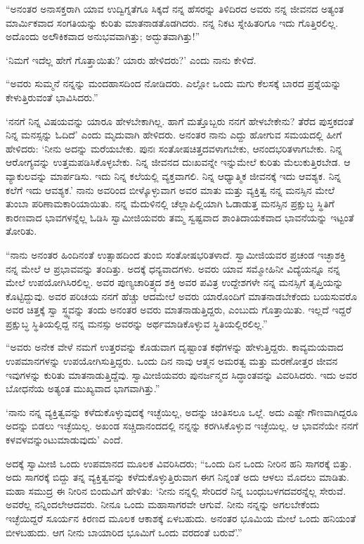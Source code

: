  “ಅನಂತರ ಅನಾಸಕ್ತರಾಗಿ ಯಾವ ಉದ್ವಿಗ್ನತೆಗೂ ಸಿಕ್ಕದೆ ನನ್ನ ಹೆಸರನ್ನು ತಿಳಿದಿರದ ಅವರು ನನ್ನ ಜೀವನದ ಅತ್ಯಂತ ಮಾರ್ಮಿಕವಾದ ಸಂಗತಿಯನ್ನು ಕುರಿತು ಮಾತನಾಡತೊಡಗಿದರು. ನನ್ನ ನಿಕಟ ಸ್ನೇಹಿತರಿಗೂ ಇದು ಗೊತ್ತಿರಲಿಲ್ಲ. ಅದೊಂದು ಅಲೌಕಿಕವಾದ ಅನುಭವವಾಗಿತ್ತು; ಅದ್ಭುತವಾಗಿತ್ತು!” 

 ‘ನಿಮಗೆ ಇದೆಲ್ಲ ಹೇಗೆ ಗೊತ್ತಾಯಿತು? ಯಾರು ಹೇಳಿದರು?’ ಎಂದು ನಾನು ಕೇಳಿದೆ. 

 “ಅವರು ಸುಮ್ಮನೆ ನನ್ನನ್ನು ಮಂದಹಾಸದಿಂದ ನೋಡಿದರು. ಎಲ್ಲೋ ಒಂದು ಮಗು ಕೆಲಸಕ್ಕೆ ಬಾರದ ಪ್ರಶ್ನೆಯನ್ನು ಕೇಳುತ್ತಿರುವಂತೆ ಭಾವಿಸಿದರು.” 

 ‘ನನಗೆ ನಿನ್ನ ವಿಷಯವನ್ನು ಯಾರೂ ಹೇಳಬೇಕಾಗಿಲ್ಲ. ಹಾಗೆ ಮತ್ತೊಬ್ಬರು ನನಗೆ ಹೇಳಬೇಕೇನು? ತೆರೆದ ಪುಸ್ತಕದಂತೆ ನಿನ್ನ ಮನಸ್ಸನ್ನು ಓದಿದೆ’ ಎಂದು ಮೃದುವಾಗಿ ಹೇಳಿದರು. ಅನಂತರ ನಾನು ಎದ್ದು ಹೋಗುವ ಸಮಯದಲ್ಲಿ ಹೀಗೆ ಹೇಳಿದರು: ‘ನೀನು ಅದನ್ನು ಮರೆಯಬೇಕು. ಪುನಃ ಸಂತೋಷಚಿತ್ತದವಳಾಗಬೇಕು, ಆನಂದಭರಿತಳಾಗಬೇಕು. ನಿನ್ನ ಆರೋಗ್ಯವನ್ನು ಉತ್ತಮಪಡಿಸಿಕೊಳ್ಳಬೇಕು. ನಿನ್ನ ಜೀವನದ ದುಃಖವನ್ನೇ ಇನ್ನುಮೇಲೆ ಕುರಿತು ಮೆಲುಕುತ್ತಿರಬೇಡ. ಆ ವ್ಯಾಕುಲವನ್ನು ಮಾರ್ಪಡಿಸು. ಇದು ನಿನ್ನ ಕಲೆಯಲ್ಲಿ ವ್ಯಕ್ತವಾಗಲಿ. ನಿನ್ನ ಆಧ್ಯಾತ್ಮಿಕ ಜೀವನಕ್ಕೆ ಇದು ಆವಶ್ಯಕ. ನಿನ್ನ ಕಲೆಗೆ ಇದು ಆವಶ್ಯಕ.’ ನಾನು ಅವರಿಂದ ಬೀಳ್ಕೊಳ್ಳುವಾಗ ಅವರ ಮಾತು ಮತ್ತು ವ್ಯಕ್ತಿತ್ವ ನನ್ನ ಮನಸ್ಸಿನ ಮೇಲೆ ತುಂಬಾ ಪರಿಣಾಮಕಾರಿಯಾಯಿತು. ನನ್ನ ಮೆದುಳಿನಲ್ಲಿ ಚೆಲ್ಲಾಪಿಲ್ಲಿಯಾಗಿ ಓಡಾಡುತ್ತ ಮನಸ್ಸಿನ ಪ್ರಕ್ಷುಬ್ಧ ಸ್ಥಿತಿಗೆ ಕಾರಣವಾದ ಭಾವಗಳನ್ನೆಲ್ಲ ಓಡಿಸಿ ಸ್ವಾಮೀಜಿಯವರು ತಮ್ಮ ಸ್ವಷ್ಟವಾದ ಶಾಂತಿದಾಯಕವಾದ ಭಾವನೆಯನ್ನು ಇಟ್ಟಂತೆ ತೋರಿತು. 

 “ನಾನು ಅನಂತರ ಹಿಂದಿನಂತೆ ಉತ್ಸಾಹದಿಂದ ತುಂಬಿ ಸಂತೋಷಭರಿತಳಾದೆ. ಸ್ವಾಮೀಜಿಯವರ ಪ್ರಚಂಡ ಇಚ್ಛಾಶಕ್ತಿ ನನ್ನ ಮೇಲೆ ಆ ಪ್ರಭಾವವನ್ನು ತಂದಿತ್ತು. ಅದಕ್ಕೆ ಧನ್ಯವಾದಗಳು. ಅವರು ಯಾವ ಸಮ್ಮೋಹಿನೀ ವಿದ್ಯೆಯನ್ನೂ ನನ್ನ ಮೇಲೆ ಉಪಯೋಗಿಸಿರಲಿಲ್ಲ. ಅವರ ಪುಣ್ಯಚಾರಿತ್ರ್ಯದ ಶಕ್ತಿ ಅವರ ಪವಿತ್ರ ಉದ್ದೇಶಗಳೇ ನನ್ನ ಮನಸ್ಸಿಗೆ ತೃಪ್ತಿಯನ್ನು ಕೊಟ್ಟಿದ್ದುವು. ಅವರ ಪರಿಚಯ ನನಗೆ ಹೆಚ್ಚು ಆದಮೇಲೆ ಅವರು ಯಾರೊಂದಿಗೆ ಮಾತನಾಡಬೇಕೆಂದು ಬಯಸುವರೊ ಅವರ ಚಿತ್ತಕ್ಕೆ ಸ್ವಾ ಸ್ಥ್ಯವನ್ನು ತಂದು ಅನಂತರ ಅವರು ಮಾತನಾಡುತ್ತಿದ್ದರು, ಎಂಬುದು ಗೊತ್ತಾಯಿತು. ಇಲ್ಲದೆ ಇದ್ದರೆ ಪ್ರಕ್ಷುಬ್ಧ ಸ್ಥಿತಿಯಲ್ಲಿದ್ದ ನನ್ನ ಮನಸ್ಸು ಅವರನ್ನು ಅರ್ಥಮಾಡಿಕೊಳ್ಳುವ ಸ್ಥಿತಿಯಲ್ಲಿರಲಿಲ್ಲ.” 

 “ಅವರು ಅನೇಕ ವೇಳೆ ನಮಗೆ ಉತ್ತರವನ್ನು ಕೊಡುವಾಗ ದೃಷ್ಟಾಂತ ಕಥೆಗಳನ್ನು ಹೇಳುತ್ತಿದ್ದರು. ಕಾವ್ಯಮಯವಾದ ಉಪಮಾನಗಳನ್ನು ಉಪಯೋಗಿಸುತ್ತಿದ್ದರು. ಒಂದು ದಿನ ನಾವು ಆತ್ಮನ ಅಮರತ್ವ ಮತ್ತು ಮರಣೋತ್ತರ ಜೀವನ ಇವುಗಳನ್ನು ಕುರಿತು ಮಾತನಾಡುತ್ತಿದ್ದೆವು. ಸ್ವಾಮೀಜಿಯವರು ಪುನರ್ಜನ್ಮದ ಸಿದ್ಧಾಂತವನ್ನು ವಿವರಿಸಿದರು. ಇದು ಅವರ ಬೋಧನೆಯ ಅತ್ಯಂತ ಮುಖ್ಯವಾದ ಭಾಗವಾಗಿತ್ತು.” 

 ‘ನಾನು ನನ್ನ ವ್ಯಕ್ತಿತ್ವವನ್ನು ಕಳೆದುಕೊಳ್ಳುವುದಕ್ಕೆ ಇಚ್ಛೆಯಿಲ್ಲ, ಅದನ್ನು ಚಿಂತಿಸಲೂ ಒಲ್ಲೆ. ಅದು ಎಷ್ಟೇ ಗೌಣವಾಗಿದ್ದರೂ ಅದನ್ನು ಬಿಡಲು ಇಚ್ಛೆಯಿಲ್ಲ. ಅಖಂಡ ಸಚ್ಚಿದಾನಂದದಲ್ಲಿ ನನ್ನನ್ನು ಕರಗಿಸಿಕೊಳ್ಳುವ ಇಚ್ಛೆಯಿಲ್ಲ. ಆ ಭಾವನೆಯೇ ನನಗೆ ಕಳವಳವನ್ನುಂಟುಮಾಡುವುದು’ ಎಂದೆ. 

 ಅದಕ್ಕೆ ಸ್ವಾಮೀಜಿ ಒಂದು ಉಪಮಾನದ ಮೂಲಕ ವಿವರಿಸಿದರು; “ಒಂದು ದಿನ ಒಂದು ನೀರಿನ ಹನಿ ಸಾಗರಕ್ಕೆ ಬಿತ್ತು. ಅದು ಸಾಗರಕ್ಕೆ ಬಿದ್ದು ತನ್ನ ವ್ಯಕ್ತಿತ್ವವನ್ನು ಕಳೆದುಕೊಳ್ಳುತ್ತಿರುವಾಗ ಈಗ ನಿನ್ನಂತೆ ಅದು ಆಳಲು ಮೊದಲು ಮಾಡಿತು. ಮಹಾ ಸಮುದ್ರ ಈ ನೀರಿನ ಬಿಂದುವಿಗೆ ಹೇಳಿತು: ‘ನೀನು ನನ್ನಲ್ಲಿ ಸೇರಿದರೆ ನಿನ್ನ ಬಂಧುಬಳಗದವರನ್ನೆಲ್ಲ ಸೇರುವೆ. ಅವರೆಲ್ಲ ನನ್ನಿಂದಲೇ‌ಆದವರು. ನೀನೂ ಒಂದು ಮಹಾಸಾಗರವೇ ಆಗುವೆ. ನೀನು ನನ್ನನ್ನು ಅಗಲಬೇಕೆಂದು ಇಚ್ಛೆಯಿದ್ದರೆ ಸೂರ್ಯನ ಕಿರಣದ ಮೂಲಕ ಆಕಾಶಕ್ಕೆ ಏಳಬಹುದು. ಅನಂತರ ಭೂಮಿಯ ಮೇಲೆ ಒಂದು ಹನಿಯಂತೆ ಬೀಳಬಹುದು. ಆಗ ನೀನು ಬಾಯಾರಿದ ಭೂಮಿಗೆ ಒಂದು ವರದಂತೆ ಬರುವೆ’.” 

